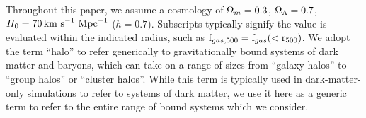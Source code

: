 Throughout this paper, we assume a cosmology of $\Omega_m = 0.3$,
$\Omega_\Lambda = 0.7$, $H_0 = 70\,\textrm{km~s}^{-1}~\textrm{Mpc}^{-1}$ ($h = 0.7$). Subscripts typically
signify the value is evaluated within the indicated radius, such as
$\textrm{f\ensuremath{_{gas,500}}}{} = \textrm{f\ensuremath{_{gas}}}{}(<\textrm{r\ensuremath{_{500}}})$. We adopt the term ``halo'' to refer
generically to gravitationally bound systems of dark matter and
baryons, which can take on a range of sizes from ``galaxy halos'' to
``group halos'' or ``cluster halos''. While this term is typically
used in dark-matter-only simulations to refer to systems of dark
matter, we use it here as a generic term to refer to the entire range
of bound systems which we consider.

